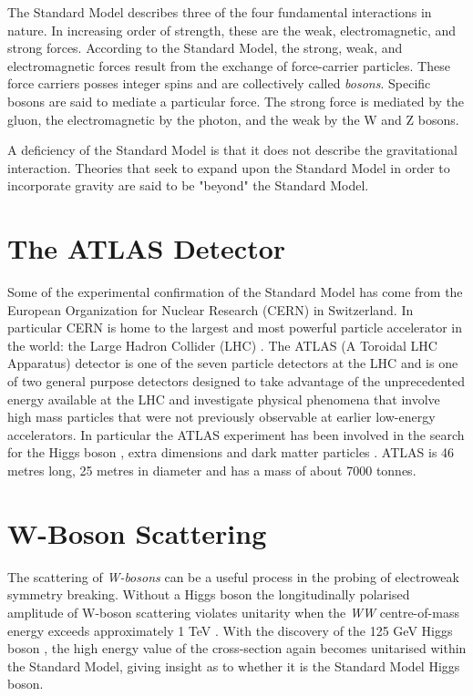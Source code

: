 \documentclass[a4paper]{jpconf}
\begin{document}
The Standard Model describes three of the four fundamental interactions in nature. In increasing order of strength, these are the weak, electromagnetic, and strong forces. According to the Standard Model, the strong, weak, and electromagnetic forces result from the exchange of force-carrier particles. These force carriers posses integer spins and are collectively called \emph{bosons}. Specific bosons are said to mediate a particular force. The strong force is mediated by the gluon, the electromagnetic by the photon, and the weak by the W and Z bosons.

A deficiency of the Standard Model is that it does not describe the gravitational interaction. Theories that seek to expand upon the Standard Model in order to incorporate gravity are said to be "beyond" the Standard Model.
\section{The ATLAS Detector}
Some of the experimental confirmation of the Standard Model has come from the European Organization for Nuclear Research (CERN) in Switzerland. In particular CERN is home to the largest and most powerful particle accelerator in the world: the Large Hadron Collider (LHC) \cite{lhc}. The ATLAS (A Toroidal LHC Apparatus) detector \cite{atlas} is one of the seven particle detectors at the LHC and is one of two general purpose detectors designed to take advantage of the unprecedented energy available at the LHC and investigate physical phenomena that involve high mass particles that were not previously observable at earlier low-energy accelerators. In particular the ATLAS experiment has been involved in the search for the Higgs boson \cite{atlas_higgs}, extra dimensions and dark matter particles \cite{atlas_dm_ed}. ATLAS is 46 metres long, 25 metres in diameter and has a mass of about 7000 tonnes.
\section{W-Boson Scattering}
The scattering of \emph{W-bosons} can be a useful process in the probing of electroweak symmetry breaking. Without a Higgs boson the longitudinally polarised amplitude of W-boson scattering violates unitarity when the \emph{WW} centre-of-mass energy exceeds approximately 1 TeV \cite{violation1,violation2,violation3}. With the discovery of the 125 GeV Higgs boson \cite{atlas_higgs,cms_higgs} , the high energy value of the cross-section again becomes unitarised within the Standard Model, giving insight as to whether it is the Standard Model Higgs boson.
\end{document}
